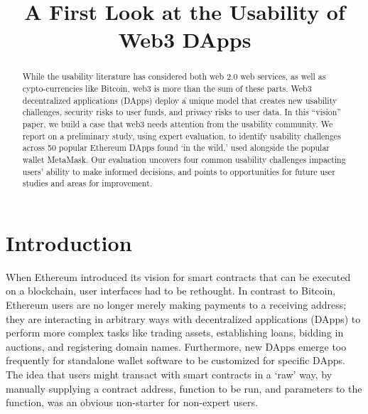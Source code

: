 \documentclass[conference]{IEEEtran}
\begin{document}
%
\title{A First Look at the Usability of Web3 DApps}
%
%
\author{}
%
%
\maketitle              %
%
\begin{abstract}
While the usability literature has considered both web 2.0 web services, as well as cypto-currencies like Bitcoin, web3 is more than the sum of these parts. Web3 decentralized applications (DApps) deploy a unique model that creates new usability challenges, security risks to user funds, and privacy risks to user data.
In this ``vision'' paper, we build a case that web3 needs attention from the usability community. 
We report on a preliminary study, using expert evaluation, to identify usability challenges across 50 popular Ethereum DApps found `in the wild,' used alongside the popular wallet MetaMask.
Our evaluation uncovers four common usability challenges impacting users' ability to make informed decisions, and points to opportunities for future user studies and areas for improvement.
\end{abstract}
%
%
%
\section{Introduction}

When Ethereum introduced its vision for smart contracts that can be executed on a blockchain, user interfaces had to be rethought. In contrast to Bitcoin, Ethereum users are no longer merely making payments to a receiving address; they are interacting in arbitrary ways with decentralized applications (DApps) to perform more complex tasks like trading assets, establishing loans, bidding in auctions, and registering domain names. Furthermore, new DApps emerge too frequently for standalone wallet software to be customized for specific DApps. The idea that users might transact with smart contracts in a `raw' way, by manually supplying a contract address, function to be run, and parameters to the function, was an obvious non-starter for non-expert users. 
\end{document}
